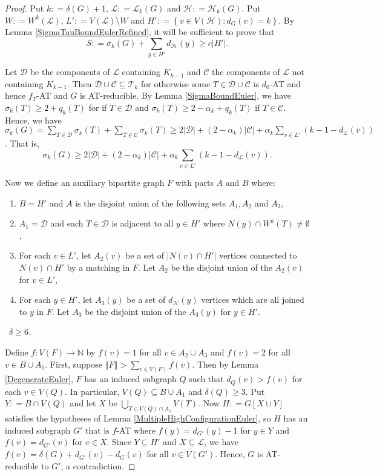 \documentclass[12pt]{article}
\theoremstyle{plain}
\theoremstyle{definition}
\theoremstyle{remark}
\newcommand{\fancy}[1]{\mathcal{#1}}
\newcommand{\IN}{\mathbb{N}}
\newcommand{\CC}{\fancy{C}}
\newcommand{\D}{\fancy{D}}
\newcommand{\T}{\fancy{T}}
\renewcommand{\L}{\fancy{L}}
\newcommand{\HH}{\fancy{H}}
\newcommand{\setb}[3]{\left\{ #1 \in #2 : #3 \right\}}
\newcommand{\card}[1]{\left|#1\right|}
\newcommand{\size}[1]{\left\Vert#1\right\Vert}
\newcommand{\func}[3]{#1\colon #2 \rightarrow #3}
\newcommand{\parens}[1]{\left( #1 \right)}
\newcommand{\DefinedAs}{\mathrel{\mathop:}=}
\def\D{\fancy{D}}
\newcommand{\case}[2]{{\bf Case #1.}~{\it #2}~~}
\begin{document}
\begin{proof}
Put $k \DefinedAs \delta(G) + 1$, $\L \DefinedAs \L_k(G)$ and $\HH \DefinedAs \HH_k(G)$.  Put $W \DefinedAs W^k(\L)$, $L' \DefinedAs V(\L) \setminus W$ and $H' \DefinedAs \setb{v}{V(\HH)}{d_G(v) = k}$.   By Lemma \ref{SigmaTauBoundEulerRefined}, it will be sufficient to prove that \[S \DefinedAs \sigma_k(G) + \sum_{y \in H'} d_{\HH}(y) \ge c\card{H'}.\]

Let $\D$ be the components of $\L$ containing $K_{k-1}$ and $\CC$ the components of $\L$ not containing $K_{k-1}$.  Then $\D \cup \CC \subseteq \T_k$ for otherwise some $T \in \D \cup \CC$ is $d_0$-AT and hence $f_T$-AT and $G$ is AT-reducible.  By Lemma \ref{SigmaBoundEuler}, we have $\sigma_k(T) \ge 2 + q_k(T)$ for if $T \in \D$ and $\sigma_k(T) \ge 2 - \alpha_k + q_k(T)$ if $T \in \CC$.  Hence, we have $\sigma_k(G) = \sum_{T \in \D} \sigma_k(T) + \sum_{T \in \CC} \sigma_k(T) \ge 2\card{\D} + (2-\alpha_k)\card{\CC} + \alpha_k\sum_{v \in L'} \parens{k-1 - d_{\L}(v)}$.  That is,
\[\sigma_k(G) \ge 2\card{\D} + (2-\alpha_k)\card{\CC} + \alpha_k\sum_{v \in L'} \parens{k-1 - d_{\L}(v)}.\]

Now we define an auxiliary bipartite graph $F$ with parts $A$ and $B$ where:
\begin{enumerate}
\item  $B = H'$ and $A$ is the disjoint union of the following sets
$A_1, A_2$ and $A_3$,
\item $A_1 = \D$ and each $T \in \D$ is adjacent to all $y \in H'$
where $N(y) \cap W^k(T) \ne \emptyset$,
\item For each $v \in L'$, let $A_2(v)$ be a set of $\card{N(v) \cap
H'}$ vertices connected to $N(v) \cap H'$ by a matching in $F$.  Let
$A_2$ be the disjoint union of the $A_2(v)$ for $v \in L'$,
\item For each $y \in H'$, let $A_3(y)$ be a set of $d_{\HH}(y)$ vertices
which are all joined to $y$ in $F$.  Let $A_3$ be the disjoint union
of the $A_3(y)$ for $y \in H'$.
\end{enumerate}

\noindent \case{1}{$\delta \ge 6$.}
\smallskip

Define $\func{f}{V(F)}{\IN}$ by $f(v) = 1$ for all $v \in A_2 \cup A_3$ and $f(v) = 2$ for all $v \in B \cup A_1$.  First, suppose $\size{F} > \sum_{v \in V(F)} f(v)$.  Then by Lemma \ref{DegenerateEuler}, $F$ has an induced subgraph $Q$ such that $d_Q(v) > f(v)$ for each $v \in V(Q)$.  In particular, $V(Q) \subseteq B \cup A_1$ and $\delta(Q) \ge 3$.  Put $Y \DefinedAs B \cap V(Q)$ and let $X$ be $\bigcup_{T \in V(Q) \cap A_1} V(T)$. Now $H \DefinedAs G[X \cup Y]$ satisfies the hypotheses of Lemma \ref{MultipleHighConfigurationEuler}, so $H$ has an induced subgraph $G'$ that is $f$-AT where $f(y) = d_{G'}(y) - 1$ for $y \in Y$ and $f(v) = d_{G'}(v)$ for $v \in X$.  Since $Y \subseteq H'$ and $X \subseteq \L$, we have $f(v) = \delta(G) + d_{G'}(v) - d_G(v)$ for all $v \in V(G')$.  Hence, $G$ is AT-reducible to $G'$, a contradiction.


\end{proof}
\end{document}
